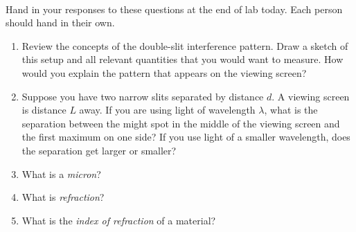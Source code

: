 \documentclass{tufte-handout}
\begin{document}



\vspace{0.5cm}
\\
\vspace{0.5cm}

Hand in your responses to these questions at the end of lab today. Each person should hand in their own.

\begin{enumerate}

\item Review the concepts of the double-slit interference pattern. Draw a sketch of this setup and
    all relevant quantities that you would want to measure. How would you explain the pattern that appears on the 
        viewing screen?

\item Suppose you have two narrow slits separated by distance $d$. A viewing screen is distance $L$ away. If you are
using light of wavelength $\lambda$, what is the separation between the might spot in the middle of
the viewing screen and the first maximum on one side? If you use light of a smaller wavelength, does
the separation get larger or smaller?

\item What is a {\it micron}?

\item What is {\it refraction}?

\item What is the {\it index of refraction} of a material?

\end{enumerate}
\end{document}
